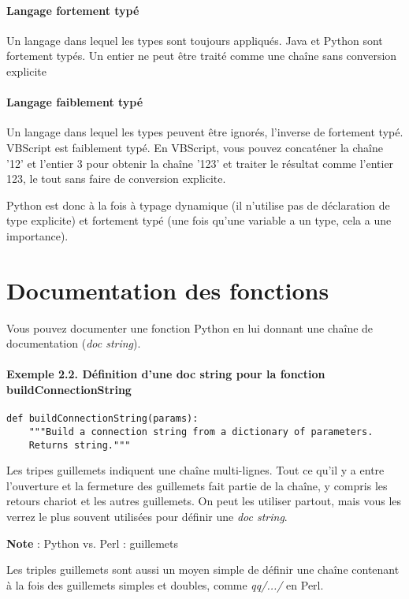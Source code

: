 \paragraph{Langage fortement typé}
Un langage dans lequel les types sont toujours appliqués. Java et Python sont fortement typés. Un entier ne peut être traité comme une chaîne sans conversion explicite

\paragraph*{Langage faiblement typé}
Un langage dans lequel les types peuvent être ignorés, l'inverse de fortement typé. VBScript est faiblement typé. En VBScript, vous pouvez concaténer la chaîne '12' et l'entier 3 pour obtenir la chaîne '123' et  traiter le résultat comme l'entier 123, le tout sans faire de conversion explicite.

\medskip
Python est donc à la fois à typage dynamique (il n'utilise pas de déclaration de type explicite) et fortement typé (une fois qu'une variable a un type, cela a une importance).

\section*{Documentation des fonctions}
Vous pouvez documenter une fonction Python en lui donnant une chaîne de documentation (\emph{doc string}).

\paragraph*{Exemple 2.2. Définition d'une doc string pour la fonction buildConnectionString}

\begin{lstlisting}
def buildConnectionString(params):
    """Build a connection string from a dictionary of parameters.
    Returns string."""
\end{lstlisting}

Les tripes guillemets indiquent une chaîne multi-lignes. Tout ce qu'il y a entre l'ouverture et la fermeture des guillemets fait partie de la chaîne, y compris les retours chariot et les autres guillemets. On peut les utiliser partout, mais vous les verrez le plus souvent utilisées pour définir une \emph{doc string}.

\medskip
\noindent \textbf{Note} : Python vs. Perl : guillemets

Les triples guillemets sont aussi un moyen simple de définir une chaîne contenant à la fois des guillemets simples et doubles, comme \emph{qq/.../} en Perl.
\medskip


